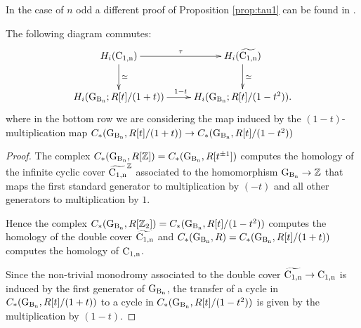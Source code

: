 In the case of $n$ odd a different proof of Proposition \ref{prop:tau1} can be found in \cite[Lem.~58]{bianchi}.

\begin{prop}\label{prop:commut_tau}
The following diagram commutes:
$$
\begin{tabular}{c}
\xymatrix @R=2pc @C=2pc {
H_i(\confm{n})\ar[d]^\simeq \ar[r]^{\tau} &H_i(\confmd{n}) \ar[d]^\simeq \\
H_i(\Gb{n}; \ring[t]/(1+t)) \ar[r]^{1-t} & H_i(\Gb{n}; \ring[t]/(1-t^2))	.
}
\end{tabular}
$$
where in the bottom row we are considering the map induced by the $(1-t)$-multiplication map $C_*(\operatorname{G_{B_{n}}}, R[t]/(1+t)) \to C_*(\operatorname{G_{B_{n}}}, R[t]/(1-t^2))$ 
\end{prop}
\begin{proof}

The complex $C_*(\operatorname{G_{B_{n}}}, R[\mathbb{Z}]) = C_*(\operatorname{G_{B_{n}}}, R[t^{\pm 1}])$ computes the homology of the infinite cyclic cover $\widetilde{\operatorname{C_{1,n}}}^{\mathbb{Z}}$ associated to the homomorphism $\operatorname{G_{B_{n}}} \to \mathbb{Z}$ that maps the first standard generator to multiplication by $(-t)$ and all other generators to multiplication by $1$.

Hence the complex $C_*(\operatorname{G_{B_{n}}}, R[\mathbb{Z}_2]) = C_*(\operatorname{G_{B_{n}}}, R[t]/(1-t^2))$ computes the homology of the double cover $\widetilde{\operatorname{C_{1,n}}}$ and $C_*(\operatorname{G_{B_{n}}}, R) = C_*(\operatorname{G_{B_{n}}}, R[t]/(1+t))$ computes the homology of $\operatorname{C_{1,n}}$.

Since the non-trivial monodromy associated to the double cover $\widetilde{\operatorname{C_{1,n}}} \to \operatorname{C_{1,n}}$ is induced by the first generator of $\operatorname{G_{B_{n}}}$, the transfer of a cycle  in $C_*(\operatorname{G_{B_{n}}}, R[t]/(1+t))$ to a cycle in $C_*(\operatorname{G_{B_{n}}}, R[t]/(1-t^2))$ is given by the multiplication by $(1 -t)$.
\end{proof}


